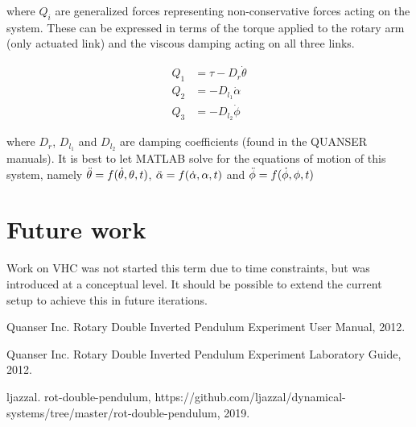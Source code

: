 \documentclass[12pt,letterpaper]{article}
\begin{document}
where $Q_i$ are generalized forces representing non-conservative forces acting on the system. These can be expressed in terms of the torque applied to the rotary arm (only actuated link) and the viscous damping acting on all three links.

\begin{align*}
    Q_1 &= \tau - D_r \Dot{\theta} \\
    Q_2 &= -D_{l_1} \Dot{\alpha} \\
    Q_3 &= -D_{l_2} \Dot{\phi}
\end{align*}

where $D_r$, $D_{l_1}$ and $D_{l_2}$ are damping coefficients (found in the QUANSER manuals). It is best to let MATLAB solve for the equations of motion of this system, namely $\Ddot{\theta} = f(\Dot{\theta}, \theta, t)$, $\Ddot{\alpha} = f(\Dot{\alpha}, \alpha, t)$ and $\Ddot{\phi} = f(\Dot{\phi}, \phi, t)$

\section{Future work}

Work on VHC was not started this term due to time constraints, but was introduced at a conceptual level. It should be possible to extend the current setup to achieve this in future iterations.

\pagebreak
\begin{thebibliography}{12}
\raggedright

Quanser Inc. Rotary Double Inverted Pendulum Experiment User Manual, 2012.

Quanser Inc. Rotary Double Inverted Pendulum Experiment Laboratory Guide, 2012.

ljazzal. rot-double-pendulum, https://github.com/ljazzal/dynamical-systems/tree/master/rot-double-pendulum, 2019.

\end{thebibliography}
\end{document}
